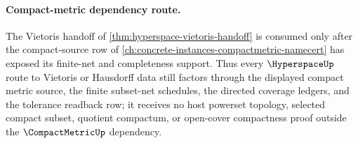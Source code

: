\paragraph{Compact-metric dependency route.}
The Vietoris handoff of \autoref{thm:hyperspace-vietoris-handoff} is consumed only after the compact-source row of \autoref{ch:concrete-instances-compactmetric-namecert} has exposed its finite-net and completeness support. Thus every $\HyperspaceUp$ route to Vietoris or Hausdorff data still factors through the displayed compact metric source, the finite subset-net schedules, the directed coverage ledgers, and the tolerance readback row; it receives no host powerset topology, selected compact subset, quotient compactum, or open-cover compactness proof outside the $\CompactMetricUp$ dependency.
